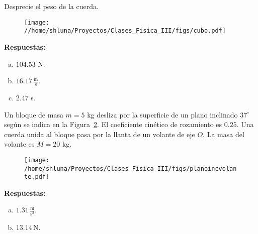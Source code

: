 \documentclass[addpoints]{exam}
\newcommand{\grado}[0]{^{\circ}}
\newcommand{\rtas}{\textbf{Respuestas: }}
\begin{document}
\begin{questions}
 Desprecie el peso de la cuerda.

    \begin{figure}[ht]
        \centering
        \texttt{[image: //home/shluna/Proyectos/Clases\_Fisica\_III/figs/cubo.pdf]}
        \caption{ }
        \label{fig:cubo}
    \end{figure}

    \rtas
    \begin{enumerate}[(a)]
        \item $104.53$ N.
        \item $16.17 \, \frac{\text{m}}{\text{s}}$.
        \item $2.47$ s.
    \end{enumerate}

    \question Un bloque de masa $m = 5$ kg desliza por la superficie de un plano inclinado $37\grado$ según se indica en la Figura~\ref{fig:planoincvol}. El coeficiente cinético de rozamiento es $0.25$. Una cuerda unida al bloque pasa por la llanta de un volante de eje $O$. La masa del volante es $M = 20$ kg.

    \begin{figure}[ht]
        \centering
        \texttt{[image: /home/shluna/Proyectos/Clases\_Fisica\_III/figs/planoincvolante.pdf]}
        \caption{ }
        \label{fig:planoincvol}
    \end{figure}

    \rtas
    \begin{enumerate}[(a)]
        \item $1.31 \, \frac{\text{m}}{\text{s}^2}$.
        \item $13.14 \, \text{N}$.
    \end{enumerate}


\end{questions}
\end{document}
